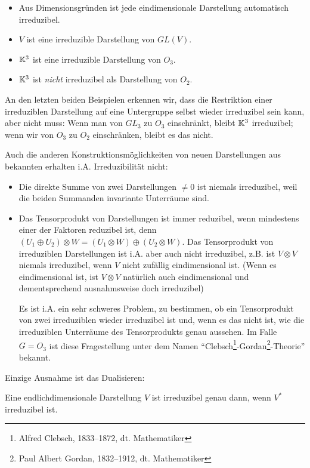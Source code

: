 \begin{example}
\begin{itemize}
\item Aus Dimensionsgründen ist jede eindimensionale Darstellung automatisch irreduzibel.
\item $V$ ist eine irreduzible Darstellung von $GL(V)$.
\item $\mathbb{K}^3$ ist eine irreduzible Darstellung von $O_3$.
\item $\mathbb{K}^3$ ist \emph{nicht} irreduzibel als Darstellung von $O_2$.
\end{itemize}
\end{example}

\begin{remark}
An den letzten beiden Beispielen erkennen wir, dass die Restriktion einer irreduziblen Darstellung auf eine Untergruppe selbst wieder irreduzibel sein kann, aber nicht muss: Wenn man von $GL_3$ zu $O_3$ einschränkt, bleibt $\mathbb{K}^3$ irreduzibel; wenn wir von $O_3$ zu $O_2$ einschränken, bleibt es das nicht.

Auch die anderen Konstruktionsmöglichkeiten von neuen Darstellungen aus bekannten erhalten i.A. Irreduzibilität nicht:
\begin{itemize}
\item Die direkte Summe von zwei Darstellungen $\neq 0$ ist niemals irreduzibel, weil die beiden Summanden invariante Unterräume sind.
\item Das Tensorprodukt von Darstellungen ist immer reduzibel, wenn mindestens einer der Faktoren reduzibel ist, denn $(U_1\oplus U_2)\otimes W = (U_1\otimes W) \oplus (U_2\otimes W)$. Das Tensorprodukt von irreduziblen Darstellungen ist i.A. aber auch nicht irreduzibel, z.B. ist $V\otimes V$ niemals irreduzibel, wenn $V$ nicht zufällig eindimensional ist. (Wenn es eindimensional ist, ist $V\otimes V$ natürlich auch eindimensional und dementsprechend ausnahmsweise doch irreduzibel)

Es ist i.A. ein sehr schweres Problem, zu bestimmen, ob ein Tensorprodukt von zwei irreduziblen wieder irreduzibel ist und, wenn es das nicht ist, wie die irreduziblen Unterräume des Tensorprodukts genau aussehen. Im Falle $G=O_3$ ist diese Fragestellung unter dem Namen \enquote{Clebsch\footnote{Alfred Clebsch, 1833--1872, dt. Mathematiker}-Gordan\footnote{Paul Albert Gordan, 1832--1912, dt. Mathematiker}-Theorie} bekannt.
\end{itemize}

Einzige Ausnahme ist das Dualisieren:
\end{remark}

\begin{lemma}
Eine endlichdimensionale Darstellung $V$ ist irreduzibel genau dann, wenn $V^\ast$ irreduzibel ist.
\end{lemma}